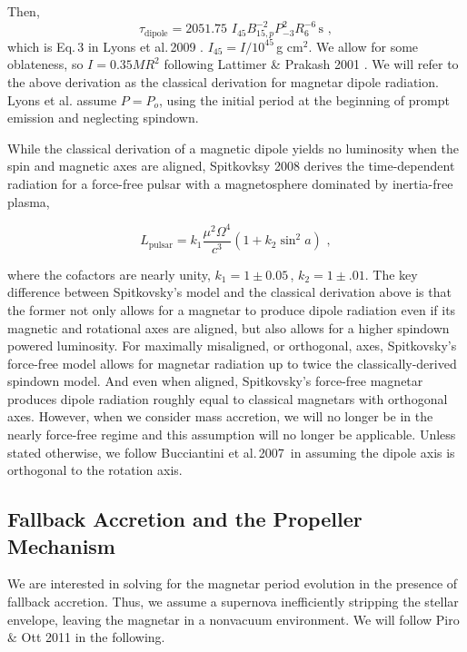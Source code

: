 \documentclass{article}
\begin{document}
Then, \begin{equation}\tau_{\mathrm{dipole}} = 2051.75\,\, I_{45} B^{-2}_{15,p} P^2_{-3} R_6^{-6}\,\mathrm{s}\,\,,\end{equation}  which is Eq.\,3 in Lyons et al.\,2009 \cite{Lyons:2009ka}. $I_{45}=I/10^{45}$\,g cm$^2$. We allow for some oblateness, so $I= 0.35 M R^2$ following Lattimer \& Prakash 2001 \cite{Lattimer:2001ap}. We will refer to the above derivation as the classical derivation for magnetar dipole radiation.
Lyons et al. assume $P=P_o$, using the initial period at the beginning of prompt emission and neglecting spindown.

While the classical derivation of a magnetic dipole yields no luminosity when the spin and magnetic axes are aligned, Spitkovksy 2008 \cite{Spitkovsky:2006np} derives the time-dependent radiation for a force-free pulsar with a magnetosphere dominated by inertia-free plasma,

\begin{equation}
L_{\mathrm{pulsar}}=k_1 \frac{\mu^2 \Omega^4}{c^3}(1+k_2 \sin^2{a})\,\,,
\end{equation}

where the cofactors are nearly unity, $k_1=1\pm 0.05$\,, $k_2=1\pm .01$. The key difference between Spitkovsky's model and the classical derivation above is that the former not only allows for a magnetar to produce dipole radiation even if its magnetic and rotational axes are aligned, but also allows for a higher spindown powered luminosity. For maximally misaligned, or orthogonal, axes, Spitkovsky's force-free model allows for magnetar radiation up to twice the classically-derived spindown model. And even when aligned, Spitkovsky's force-free magnetar produces dipole radiation roughly equal to classical magnetars with orthogonal axes.  However, when we consider mass accretion, we will no longer be in the nearly force-free regime and this assumption will no longer be applicable. Unless stated otherwise, we follow Bucciantini et al.\,2007\,\cite{Bucciantini:2007hy} in assuming the dipole axis is orthogonal to the rotation axis.

\subsection{Fallback Accretion and the Propeller Mechanism} \label{sec:fallback}

We are interested in solving for the magnetar period evolution in the presence of fallback accretion. Thus, we assume a supernova inefficiently stripping the stellar envelope, leaving the magnetar in a nonvacuum environment.  We will follow Piro $\&$ Ott 2011 \cite{Piro:2011ed} in the following. \smallskip
\end{document}
